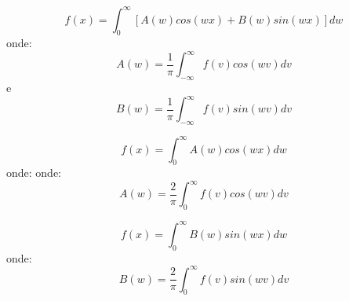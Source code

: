 \begin{equation*}
    f(x) = \int_0^\infty [A(w)cos(wx) + B(w)sin(wx)]dw
\end{equation*}
onde:
\begin{equation*}
    A(w) = \frac{1}{\pi}\int_{-\infty}^\infty f(v) cos(wv)dv
\end{equation*}
e
\begin{equation*}
    B(w) = \frac{1}{\pi} \int_{-\infty}^\infty f(v) sin(wv)dv
\end{equation*}

\begin{equation*}
    f(x) = \int_0^\infty A(w)cos(wx)dw
\end{equation*}
onde:
onde:
\begin{equation*}
    A(w) = \frac{2}{\pi}\int_0^\infty f(v) cos(wv)dv
\end{equation*}

\begin{equation*}
    f(x) = \int_0^\infty  B(w)sin(wx)dw
\end{equation*}
onde:
\begin{equation*}
    B(w) = \frac{2}{\pi} \int_0^\infty f(v) sin(wv)dv
\end{equation*}